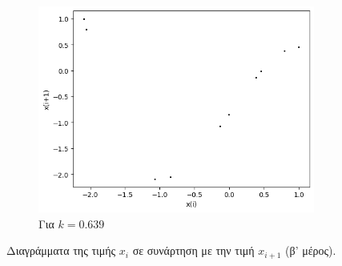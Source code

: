 \begin{figure}[ht]
\begin{subfigure}[b]{0.4\textwidth}
		\includegraphics[width=\textwidth]{LateX images/graphs q21/g13}
		\caption{Για $k=0.639$}
		\label{f:k113}
	\end{subfigure}
	\hfill
	\caption{Διαγράμματα της τιμής \(x_i\) σε συνάρτηση με την τιμή \(x_{i+1}\) (β' μέρος).}
	\label{f:k245}
\end{figure}

\clearpage
